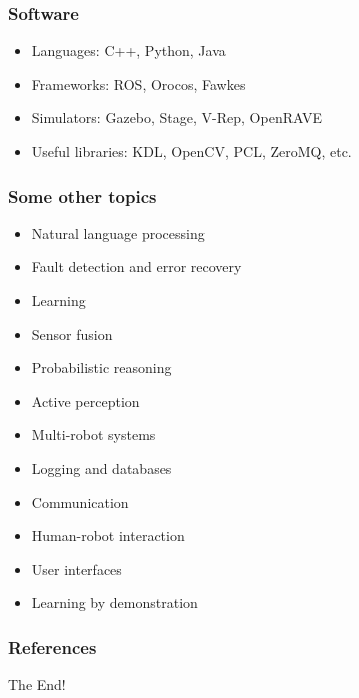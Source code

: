 \documentclass{beamer}
\begin{document}
\begin{frame}
\frametitle{Software}
\begin{itemize}
    \item <1->Languages: C++, Python, Java
    \item <2->Frameworks: ROS, Orocos, Fawkes
    \item <3->Simulators: Gazebo, Stage, V-Rep, OpenRAVE
    \item <4->Useful libraries: KDL, OpenCV, PCL, ZeroMQ, etc.
\end{itemize}
\end{frame}


\begin{frame}
\frametitle{Some other topics}
\begin{itemize}
    \item <1->Natural language processing
    \item <2->Fault detection and error recovery
    \item <3->Learning
    \item <4->Sensor fusion
    \item <5->Probabilistic reasoning
    \item <6->Active perception
    \item <7->Multi-robot systems
    \item <8->Logging and databases
    \item <9->Communication
    \item <10->Human-robot interaction
    \item <11->User interfaces
    \item <12->Learning by demonstration
\end{itemize}
\end{frame}

\appendix
\begin{frame}[allowframebreaks]
        \frametitle{References}
        
        
\end{frame}

\begin{frame}[standout]
     The End!
\end{frame}



\end{document}
